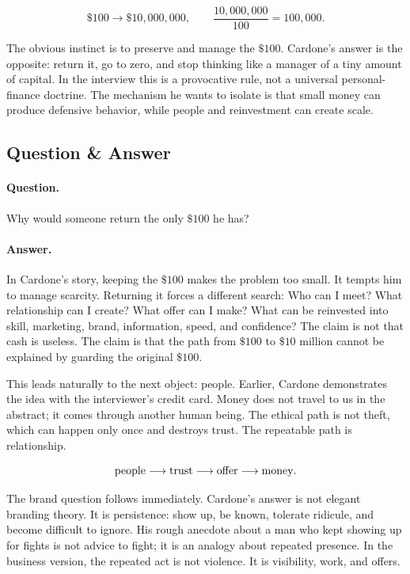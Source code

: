 \begin{equation}
\$100 \longrightarrow \$10{,}000{,}000,
\qquad
\frac{10{,}000{,}000}{100}=100{,}000.
\end{equation}

The obvious instinct is to preserve and manage the \(\$100\). Cardone's answer is the opposite: return it, go to zero, and stop thinking like a manager of a tiny amount of capital. In the interview this is a provocative rule, not a universal personal-finance doctrine. The mechanism he wants to isolate is that small money can produce defensive behavior, while people and reinvestment can create scale.

\subsection{Question \& Answer}

\paragraph{Question.} Why would someone return the only \(\$100\) he has?

\paragraph{Answer.} In Cardone's story, keeping the \(\$100\) makes the problem too small. It tempts him to manage scarcity. Returning it forces a different search: Who can I meet? What relationship can I create? What offer can I make? What can be reinvested into skill, marketing, brand, information, speed, and confidence? The claim is not that cash is useless. The claim is that the path from \(\$100\) to \(\$10\) million cannot be explained by guarding the original \(\$100\).

This leads naturally to the next object: people. Earlier, Cardone demonstrates the idea with the interviewer's credit card. Money does not travel to us in the abstract; it comes through another human being. The ethical path is not theft, which can happen only once and destroys trust. The repeatable path is relationship.

\[
\hbox{people}\longrightarrow \hbox{trust}\longrightarrow \hbox{offer}\longrightarrow \hbox{money}.
\]

The brand question follows immediately. Cardone's answer is not elegant branding theory. It is persistence: show up, be known, tolerate ridicule, and become difficult to ignore. His rough anecdote about a man who kept showing up for fights is not advice to fight; it is an analogy about repeated presence. In the business version, the repeated act is not violence. It is visibility, work, and offers.

